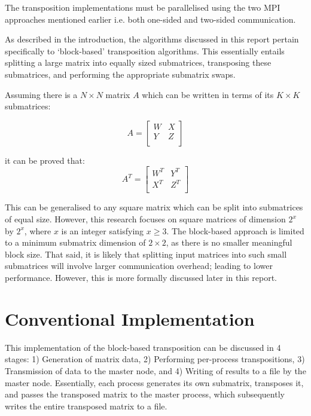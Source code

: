 \documentclass[journal,10pt,a4paper]{IEEEtran}
\begin{document}
The transposition implementations must be parallelised using the two MPI approaches mentioned earlier i.e. both one-sided and two-sided communication.

As described in the introduction, the algorithms discussed in this report pertain specifically to `block-based' transposition algorithms. This essentially entails splitting a large matrix into equally sized submatrices, transposing these submatrices, and performing the appropriate submatrix swaps.

Assuming there is a $N\times N$ matrix $A$ which can be written in terms of its $K \times K$ submatrices:

\begin{equation}
A=
\begin{bmatrix}
    W       & X \\
   Y&Z \\
\end{bmatrix}
\end{equation}


it can be proved that:
\begin{equation}
    A^T=
\begin{bmatrix}
    W^T       & Y^T \\
   X^T&Z^T \\
\end{bmatrix}
\end{equation}



This can be generalised to any square matrix which can be split into submatrices of equal size. However, this research focuses on square matrices of dimension $2^x$ by $2^x$, where $x$ is an integer satisfying $x\geq 3$. The block-based approach is limited to a minimum submatrix dimension of $2\times 2$, as there is no smaller meaningful block size. That said, it is likely that splitting input matrices into such small submatrices will involve larger communication overhead; leading to lower performance. However, this is more formally discussed later in this report.




\section{Conventional Implementation}

This implementation of the block-based transposition can be discussed in 4 stages: 1) Generation of matrix data, 2) Performing per-process transpositions, 3) Transmission of data to the master node, and 4) Writing of results to a file by the master node. Essentially, each process generates its own submatrix, transposes it, and passes the transposed matrix to the master process, which subsequently writes the entire transposed matrix to a file.
\end{document}

